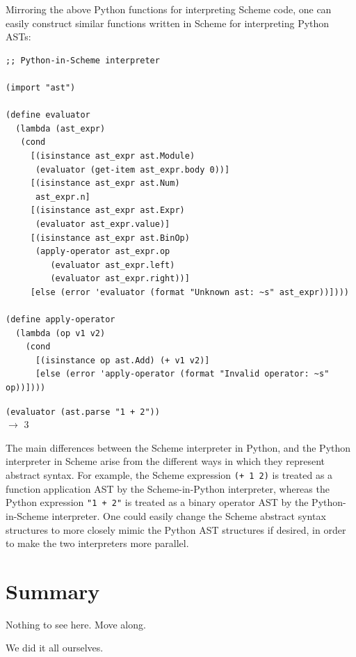 \documentclass[acmsmall,screen,authorversion]{acmart}
\begin{document}
Mirroring the above Python functions for interpreting Scheme code, one can
easily construct similar functions written in Scheme for interpreting Python
ASTs:\\

\begin{minipage}{\textwidth}
{\small
\begin{verbatim}
;; Python-in-Scheme interpreter

(import "ast")

(define evaluator
  (lambda (ast_expr)
   (cond
     [(isinstance ast_expr ast.Module)
      (evaluator (get-item ast_expr.body 0))]
     [(isinstance ast_expr ast.Num)
      ast_expr.n]
     [(isinstance ast_expr ast.Expr)
      (evaluator ast_expr.value)]
     [(isinstance ast_expr ast.BinOp)
      (apply-operator ast_expr.op
         (evaluator ast_expr.left)
         (evaluator ast_expr.right))]
     [else (error 'evaluator (format "Unknown ast: ~s" ast_expr))])))

(define apply-operator
  (lambda (op v1 v2)
    (cond
      [(isinstance op ast.Add) (+ v1 v2)]
      [else (error 'apply-operator (format "Invalid operator: ~s" op))])))

\end{verbatim}
\texttt{(evaluator (ast.parse "1 + 2"))}\\
$\rightarrow$ 3\\
}
\end{minipage}

\noindent
The main differences between the Scheme interpreter in Python, and the Python
interpreter in Scheme arise from the different ways in which they represent
abstract syntax.  For example, the Scheme expression \texttt{(+~1~2)} is
treated as a function application AST by the Scheme-in-Python interpreter,
whereas the Python expression \texttt{"1~+~2"} is treated as a binary operator
AST by the Python-in-Scheme interpreter.  One could easily change the Scheme
abstract syntax structures to more closely mimic the Python AST structures if
desired, in order to make the two interpreters more parallel.

\section{Summary}

Nothing to see here. Move along.

\begin{acks}
We did it all ourselves.
\end{acks}



\end{document}
